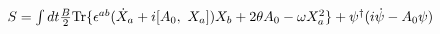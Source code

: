 \begin{equation}
\begin{array}{l}
\label{act}
S = \int dt {B \over 2} {\rm Tr} 
\{ \epsilon^{ab} (\dot{X} _a + i [A_0,~ X_a]) X_b + 2
\theta A_0 - \omega X_a ^2\} 
+ \psi^{\dag}(i \dot{\psi} - A_0 \psi)
\label{action}
\end{array}
\end{equation}

